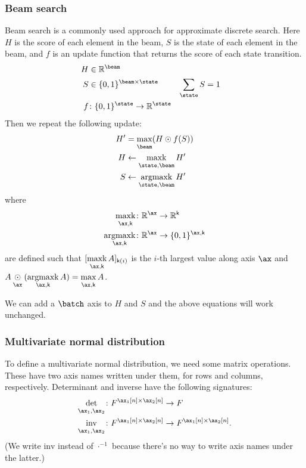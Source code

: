 \documentclass{article}
\newcommand{\reals}{\mathbb{R}}
\begin{document}
\subsubsection{Beam search}


Beam search is a commonly used approach for approximate discrete search. Here $H$ is the score of each element in the beam, $S$ is the state of each element in the beam, and $f$ is an update function that returns the score of each state transition. 
\begin{align*} 
H &\in \reals^{\beam} \\
S &\in \{0, 1\}^{\beam \times \state} & \nsum{\state} S &= 1 \\
f &\colon \{0, 1\}^{\state} \rightarrow \reals^{\state} \\
\end{align*}
Then we repeat the following update:
\begin{align*}
H' &= \nfun{\beam}{max} (H \odot f(S)) \\
H &\leftarrow \nfun{\state,\beam}{maxk} H' \\
S &\leftarrow \nfun{\state,\beam}{argmaxk} H'
\end{align*}
where
\begin{align*}
\nfun{\ax,\name{k}}{maxk} \colon \reals^{\ax} &\rightarrow \reals^{\name{k}} \\
\nfun{\ax,\name{k}}{argmaxk} \colon \reals^{\ax} &\rightarrow \{0,1\}^{\ax,\name{k}}
\end{align*}
are defined such that $[\nfun{\ax,\name{k}}{maxk} A]_{\name{k}(i)}$ is the $i$-th largest value along axis $\ax$ and $A \ndot{\ax} (\nfun{\ax,\name{k}}{argmaxk}{A}) = \nfun{\ax,\name{k}}{max} A$.

We can add a $\batch$ axis to $H$ and $S$ and the above equations will work unchanged.

\subsubsection{Multivariate normal distribution}

To define a multivariate normal distribution, we need some matrix operations. These have two axis names written under them, for rows and columns, respectively. Determinant and inverse have the following signatures:
\begin{align*}
\nfun{\ax_1,\ax_2}{det} \colon F^{\ax_1[n] \times \ax_2[n]} &\rightarrow F \\
\nfun{\ax_1,\ax_2}{inv} \colon F^{\ax_1[n] \times \ax_2[n]} &\rightarrow F^{\ax_1[n] \times \ax_2[n]}.
\end{align*}
(We write $\text{inv}$ instead of $\cdot^{-1}$ because there's no way to write axis names under the latter.)
\end{document}
